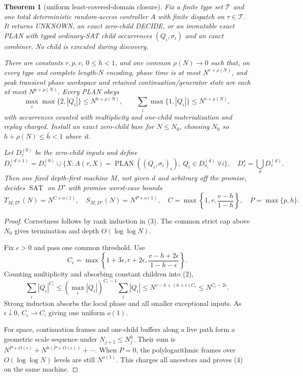 \documentclass[11pt]{article}
\newtheorem{theorem}{Theorem}
\newcommand{\SAT}{\operatorname{SAT}}
\begin{document}
\begin{theorem}[uniform least-covered-domain closure]\label{thm:closure}
Fix a finite type set $\mathcal T$ and one total deterministic random-access
controller $A$ with finite dispatch on $\tau\in\mathcal T$.  It returns
UNKNOWN, an exact zero-child DECIDE, or an immutable exact PLAN with typed
ordinary-SAT child occurrences $(Q_i,\sigma_i)$ and an exact combiner.  No
child is executed during discovery.

There are constants $r,p,v$, $0\le h<1$, and one common
$\rho(N)\to0$ such that, on every type and complete length-$N$ encoding,
phase time is at most $N^{r+\rho(N)}$, and peak transient phase workspace
and retained continuation/generator state are each at most
$N^{p+\rho(N)}$.  Every PLAN obeys
\[
 \max_i\max\{2,|Q_i|\}\le N^{h+\rho(N)},\qquad
 \sum_i\max\{1,|Q_i|\}\le N^{v+\rho(N)},                \tag{2}
\]
with occurrences counted with multiplicity and one-child materialization and
replay charged.  Install an exact zero-child base for $N\le N_0$, choosing
$N_0$ so $h+\rho(N)\le\bar h<1$ above it.

Let $D_\tau^{(0)}$ be the zero-child inputs and define
\[
D_\tau^{(d+1)}=D_\tau^{(0)}\cup
\{X:A(\tau,X)=\operatorname{PLAN}((Q_i,\sigma_i)_i),\
 Q_i\in D_{\sigma_i}^{(d)}\ \forall i\},
\quad D_\tau^\star=\bigcup_dD_\tau^{(d)}.                \tag{3}
\]
Then one fixed depth-first machine $M$, not given $d$ and arbitrary off the
promise, decides $\SAT$ on $D^\star$ with promise worst-case bounds
\[
 T_{M,D^\star}(N)=N^{C+o(1)},\quad
 S_{M,D^\star}(N)=N^{P+o(1)},\quad
 C=\max\left\{1,r,\frac{v-h}{1-h}\right\},\quad
 P=\max\{p,h\}.                                         \tag{4}
\]
\end{theorem}
\begin{proof}
Correctness follows by rank induction in (3).  The common strict cap above
$N_0$ gives termination and depth $O(\log\log N)$.

Fix $\epsilon>0$ and pass one common threshold.  Use
\[
C_\epsilon=\max\left\{1+3\epsilon,r+2\epsilon,
 \frac{v-h+2\epsilon}{1-h-\epsilon}\right\}.
\]
Counting multiplicity and absorbing constant children into (2),
\[
\sum_i|Q_i|^{C_\epsilon}
 \le(\max_i|Q_i|)^{C_\epsilon-1}\sum_i|Q_i|
 \le N^{v-h+(h+\epsilon)C_\epsilon}
 \le N^{C_\epsilon-2\epsilon}.                           \tag{5}
\]
Strong induction absorbs the local phase and all smaller exceptional inputs.
As $\epsilon\downarrow0$, $C_\epsilon\to C$, giving one uniform $o(1)$.

For space, continuation frames and one-child buffers along a live path form
a geometric scale sequence under $N_{j+1}\le N_j^{\bar h}$.  Their sum is
$N^{P+O(\epsilon)}+N^{\bar h(P+O(\epsilon))}+\cdots$.
When $P=0$, the polylogarithmic frames over $O(\log\log N)$ levels are still
$N^{o(1)}$.  This charges all ancestors and proves (4) on the same machine.
\end{proof}
\end{document}
